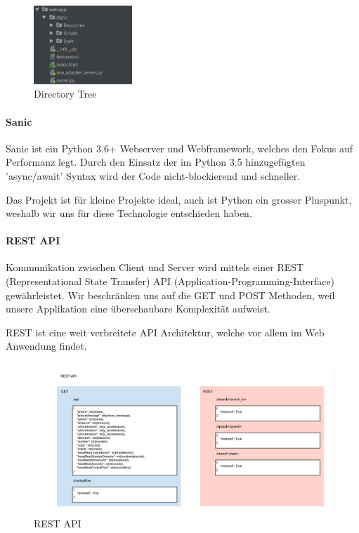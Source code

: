\documentclass[../../main.tex]{subfiles}
\begin{document}
\begin{figure}[H] \centering
  \includegraphics[width=0.33\textwidth]{Dirtree}
  \caption{Directory Tree}
  \label{fig:Dateibaum}
\end{figure}

\paragraph{Sanic}
Sanic ist ein Python 3.6+ Webserver und Webframework, welches den Fokus auf Performanz legt. Durch den Einsatz der im Python 3.5 hinzugefügten 'async/await' Syntax wird der Code nicht-blockierend und schneller.

Das Projekt ist für kleine Projekte ideal, auch ist Python ein grosser Pluspunkt, weshalb wir uns für diese Technologie entschieden haben.

\paragraph{REST API}
Kommunikation zwischen Client und Server wird mittels einer REST (Representational State Transfer) API (Application-Programming-Interface) gewährleistet. Wir beschränken uns auf die GET und POST Methoden, weil unsere Applikation eine überschaubare Komplexität aufweist.

REST ist eine weit verbreitete API Architektur, welche vor allem im Web Anwendung findet.

\begin{figure}[H] \centering
  \includegraphics[width=1\textwidth]{RESTAPI}
  \caption{REST API}
  \label{fig:REST API Web}
\end{figure}
\end{document}
